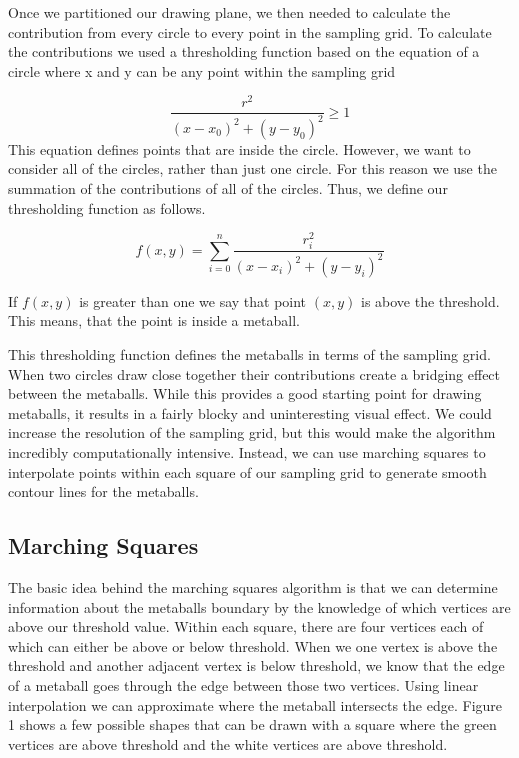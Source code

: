 \documentclass{article}
\begin{document}
Once we partitioned our drawing plane, we then needed to calculate the contribution from every circle to every point in the sampling grid. To calculate the contributions we used a thresholding function based on the equation of a circle where x and y can be any point within the sampling grid

\begin{equation*}
\frac{r^2}{(x - x_0)^2 + (y - y_0)^2} \geq 1 
\end{equation*}
This equation defines points that are inside the circle. However, we want to consider all of the circles, rather than just one circle. For this reason we use the summation of the contributions of all of the circles. Thus, we define our thresholding function as follows. 

\begin{equation*}
f(x,y)=\sum_{i = 0}^{n} \frac{r_i^2}{(x - x_i)^2 + (y - y_i)^2}
\end{equation*}

If $f(x,y)$ is greater than one we say that point $(x,y)$ is above the threshold. This means, that the point is inside a metaball.

This thresholding function defines the metaballs in terms of the sampling grid. When two circles draw close together their contributions create a bridging effect between the metaballs. While this provides a good starting point for drawing metaballs, it results in a fairly blocky and uninteresting visual effect. We could increase the resolution of the sampling grid, but this would make the algorithm incredibly computationally intensive. Instead, we can use marching squares to interpolate points within each square of our sampling grid to generate smooth contour lines for the metaballs. 

\subsection*{Marching Squares}
The basic idea behind the marching squares algorithm is that we can determine information about the metaballs boundary by the knowledge of which vertices are above our threshold value. Within each square, there are four vertices each of which can either be above or below threshold. When we one vertex is above the threshold and another adjacent vertex is below threshold, we know that the edge of a metaball goes through the edge between those two vertices. Using linear interpolation we can approximate where the metaball intersects the edge.  Figure 1 shows a few possible shapes that can be drawn with a square where the green vertices are above threshold and the white vertices are above threshold.
\end{document}
